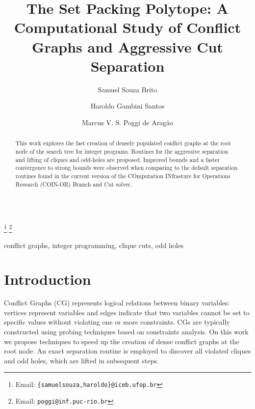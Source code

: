 \documentclass{endm}
\begin{document}
  

\begin{verbatim}\end{verbatim}\vspace{2.5cm}

\begin{frontmatter}

\title{The Set Packing Polytope: A Computational Study of Conflict Graphs and Aggressive Cut Separation}
\author{Samuel Souza Brito \and Haroldo Gambini Santos}
\address{{\small Departamento de Computação, Universidade Federal de Ouro Preto - UFOP\\ Ouro Preto, Brazil}}
\author{Marcus V. S. Poggi de Aragão}
\address{{\small Dep. de Informática, Pontifícia Universidade Católica do Rio de Janeiro - PUC-RIO\\ Rio de Janeiro, Brazil}}
\thanks[mailSamuelHaroldo]{Email: {\texttt{\normalshape \{samuelsouza,haroldo\}@iceb.ufop.br}}} 
\thanks[mailPoggi]{Email: {\texttt{\normalshape poggi@inf.puc-rio.br}}}  

\begin{abstract}
This work explores the fast creation of densely populated conflict graphs at the root node of the search tree for integer programs. Routines for the aggressive separation and lifting of cliques and odd-holes are proposed. Improved bounds and a faster convergence to strong bounds were observed when comparing to the default separation routines found in the current version of the COmputation INfrasture for Operations Research (COIN-OR) Branch and Cut solver.
\end{abstract}

\begin{keyword}
conflict graphs, integer programming, clique cuts, odd holes
\end{keyword}

\end{frontmatter}


\section{Introduction}\label{intro}

Conflict Graphs (CG) represents logical relations between binary variables: vertices represent variables and edges indicate that two variables cannot be set to specific values without violating one or more constraints. CGs are typically constructed using probing techniques\cite{Borndorfer1998} based on constraints analysis. On this work we propose techniques to speed up the creation of dense conflict graphs at the root node. An exact separation routine is employed to discover all violated cliques and odd holes, which are lifted in subsequent steps.
\end{document}
